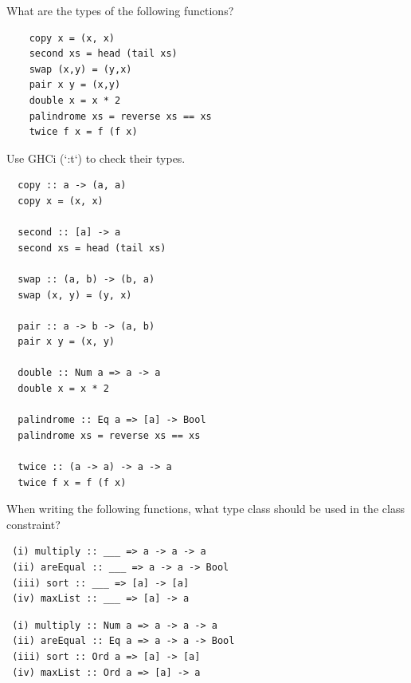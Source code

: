 \documentclass{article}
\begin{document}
\begin{exercise}
  What are the types of the following functions?
\end{exercise}

\begin{lstlisting}
    copy x = (x, x)
    second xs = head (tail xs)
    swap (x,y) = (y,x)
    pair x y = (x,y)
    double x = x * 2
    palindrome xs = reverse xs == xs
    twice f x = f (f x)
\end{lstlisting}

Use GHCi (`:t`) to check their types.

\begin{solution}
\begin{lstlisting}
  copy :: a -> (a, a)
  copy x = (x, x)

  second :: [a] -> a
  second xs = head (tail xs)

  swap :: (a, b) -> (b, a)
  swap (x, y) = (y, x)

  pair :: a -> b -> (a, b)
  pair x y = (x, y)

  double :: Num a => a -> a
  double x = x * 2

  palindrome :: Eq a => [a] -> Bool
  palindrome xs = reverse xs == xs

  twice :: (a -> a) -> a -> a
  twice f x = f (f x)
\end{lstlisting}
\end{solution}
\pagebreak
\begin{exercise}
  When writing the following functions, what type class should be used in the class constraint?
\end{exercise}

\begin{lstlisting}
 (i) multiply :: ___ => a -> a -> a
 (ii) areEqual :: ___ => a -> a -> Bool
 (iii) sort :: ___ => [a] -> [a]
 (iv) maxList :: ___ => [a] -> a
\end{lstlisting}

\begin{solution}
\begin{lstlisting}
 (i) multiply :: Num a => a -> a -> a
 (ii) areEqual :: Eq a => a -> a -> Bool
 (iii) sort :: Ord a => [a] -> [a]
 (iv) maxList :: Ord a => [a] -> a
\end{lstlisting}
\end{solution}
\end{document}
